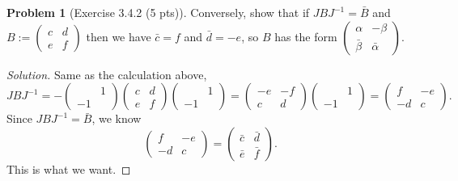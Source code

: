 \documentclass{article}
\theoremstyle{definition}
\newtheorem{problem}{Problem}
\theoremstyle{plain}
\begin{document}
\begin{problem}[Exercise 3.4.2 (5 pts)]Conversely, show that if $JBJ^{-1}=\bar{B}$ and $B:=\begin{pmatrix}c&d\\ e&f\end{pmatrix}$ then we have $\bar{c}=f$ and $\bar{d}=-e$, so $B$ has the form $\begin{pmatrix}\alpha&-\beta\\ \bar{\beta}&\bar{\alpha}\end{pmatrix}$.
\end{problem}
\begin{adjustwidth}{0.7cm}{}
\color{blue}
\begin{proof}[Solution]
Same as the calculation above,
\begin{displaymath}
JBJ^{-1}=-\begin{pmatrix}&1\\ -1&\end{pmatrix}\begin{pmatrix}c&d\\ e&f\end{pmatrix}\begin{pmatrix}&1\\ -1&\end{pmatrix}=\begin{pmatrix}-e&-f\\ c&d\end{pmatrix}\begin{pmatrix}&1\\ -1&\end{pmatrix}=\begin{pmatrix}f&-e\\ -d&c\end{pmatrix}.
\end{displaymath}
Since $JBJ^{-1}=\bar{B}$, we know
\begin{displaymath}
\begin{pmatrix}f&-e\\ -d&c\end{pmatrix}=\begin{pmatrix}\bar{c}&\bar{d}\\ \bar{e}&\bar{f}\end{pmatrix}.
\end{displaymath}
This is what we want.
\color{black}
\end{proof}
\end{adjustwidth}
\end{document}
